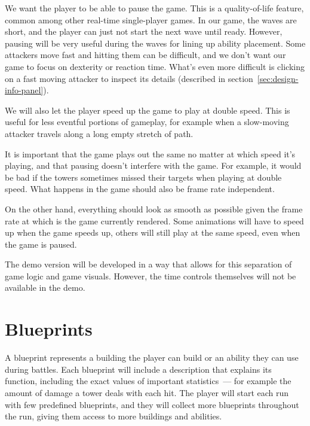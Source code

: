 \begin{notindemo}
    We want the player to be able to pause the game.
    This is a quality-of-life feature, common among other real-time single-player games.
    In our game, the waves are short, and the player can just not start the next wave until ready.
    However, pausing will be very useful during the waves for lining up ability placement.
    Some attackers move fast and hitting them can be difficult, and we don't want our game to focus on dexterity or reaction time.
    What's even more difficult is clicking on a fast moving attacker to inspect its details (described in section~\ref{sec:design-info-panel}).

    We will also let the player speed up the game to play at double speed.
    This is useful for less eventful portions of gameplay, for example when a slow-moving attacker travels along a long empty stretch of path.

    It is important that the game plays out the same no matter at which speed it's playing, and that pausing doesn't interfere with the game.
    For example, it would be bad if the towers sometimes missed their targets when playing at double speed.
    What happens in the game should also be frame rate independent.

    On the other hand, everything should look as smooth as possible given the frame rate at which is the game currently rendered.
    Some animations will have to speed up when the game speeds up, others will still play at the same speed, even when the game is paused.
\end{notindemo}

The demo version will be developed in a way that allows for this separation of game logic and game visuals.
However, the time controls themselves will not be available in the demo.

\section{Blueprints}\label{sec:design-blueprints}

A blueprint represents a building the player can build or an ability they can use during battles.
Each blueprint will include a description that explains its function, including the exact values of important statistics~--- for example the amount of damage a tower deals with each hit.
The player will start each run with few predefined blueprints, and they will collect more blueprints throughout the run, giving them access to more buildings and abilities.


